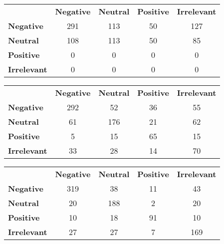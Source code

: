 \documentclass[10pt]{amsart}
\theoremstyle{definition}
\begin{document}


\begin{tabular}{lcccc}
  {} & {\bf Negative} & {\bf Neutral} & {\bf Positive} & {\bf Irrelevant}\\
  {\bf Negative}   & {291} & {113} & {50} & {127}\\
  {\bf Neutral}    & {108} & {113} & {50} & {85}\\
  {\bf Positive}   & {0} & {0} & {0} & {0}\\
  {\bf Irrelevant} & {0} & {0} & {0} & {0}\\
\end{tabular}




\begin{tabular}{lcccc}
  {} & {\bf Negative} & {\bf Neutral} & {\bf Positive} & {\bf Irrelevant}\\
  {\bf Negative}   & {292} & {52} & {36} & {55}\\
  {\bf Neutral}    & {61} & {176} & {21} & {62}\\
  {\bf Positive}   & {5} & {15} & {65} & {15}\\
  {\bf Irrelevant} & {33} & {28} & {14} & {70}\\
\end{tabular}





\begin{tabular}{lcccc}
  {} & {\bf Negative} & {\bf Neutral} & {\bf Positive} & {\bf Irrelevant}\\
  {\bf Negative}   & {319} & {38} & {11} & {43}\\
  {\bf Neutral}    & {20} & {188} & {2} & {20}\\
  {\bf Positive}   & {10} & {18} & {91} & {10}\\
  {\bf Irrelevant} & {27} & {27} & {7} & {169}\\
\end{tabular}
\end{document}
